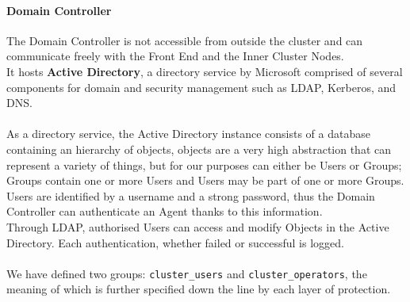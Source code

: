 \paragraph{Domain Controller}
The Domain Controller is not accessible from outside the cluster and can communicate freely with the Front End and the Inner Cluster Nodes.\\
It hosts \textbf{Active Directory}, a directory service by Microsoft comprised of several components for domain and security management such as LDAP, Kerberos, and DNS.\\ \\
As a directory service, the Active Directory instance consists of a database containing an hierarchy of objects, objects are a very high abstraction that can represent a variety of things, but for our purposes can either be Users or Groups; Groups contain one or more Users and Users may be part of one or more Groups. \\Users are identified by a username and a strong password, thus the Domain Controller can authenticate an Agent thanks to this information. \\
Through LDAP, authorised Users can access and modify Objects in the Active Directory. Each authentication, whether failed or successful is logged.\\ \\
We have defined two groups: \texttt{cluster\_users} and \texttt{cluster\_operators}, the meaning of which is further specified down the line by each layer of protection.

